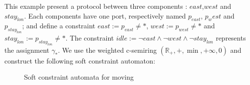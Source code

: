 \begin{example}
	This example present a protocol between three components : $east$,$west$ and $stay_{lon}$. Each components have one port, respectively named $p_{east}$, $p_west$ and $p_{stay_{lon}}$; and define a constraint $east := p_{east} \not = *$, $west := p_{west} \not = *$ and $stay_{lon} := p_{stay_{lon}} \not = *$. The constraint $idle := \neg east \land \neg west \land \neg stay_{lon}$ represents the assignment $\gamma_*$. We use the weighted c-semiring $(\mathbb{R}_+,+,\min,+\infty,0)$ and construct the following soft constraint automaton:
	\begin{figure}[H]
		\centering
		\resizebox{8cm}{!}{}
		\caption{Soft constraint automata for moving}
		\label{moveSCA}
	\end{figure}
\end{example}
\vfill